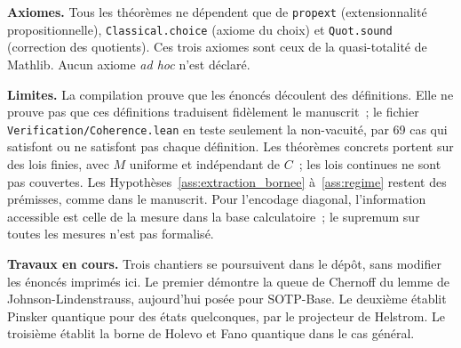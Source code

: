 \begin{sloppypar}
\noindent\textbf{Axiomes.} Tous les th\'eor\`emes ne d\'ependent que de \texttt{propext}
(extensionnalit\'e propositionnelle), \texttt{Classical.choice} (axiome du choix) et
\texttt{Quot.sound} (correction des quotients). Ces trois axiomes sont ceux de la quasi-totalit\'e
de Mathlib. Aucun axiome \emph{ad hoc} n'est d\'eclar\'e.

\medskip
\noindent\textbf{Limites.} La compilation prouve que les \'enonc\'es d\'ecoulent des
d\'efinitions. Elle ne prouve pas que ces d\'efinitions traduisent fid\`element le manuscrit~;
le fichier \texttt{Verification/Coherence.lean} en teste seulement la non-vacuit\'e, par
69 cas qui satisfont ou ne satisfont pas chaque d\'efinition. Les th\'eor\`emes concrets portent
sur des lois finies, avec $M$ uniforme et ind\'ependant de $C$~; les lois continues ne sont pas
couvertes. Les Hypoth\`eses~\ref{ass:extraction_bornee} \`a~\ref{ass:regime} restent des
pr\'emisses, comme dans le manuscrit. Pour l'encodage diagonal, l'information accessible est
celle de la mesure dans la base calculatoire~; le supremum sur toutes les mesures n'est pas
formalis\'e.

\medskip
\noindent\textbf{Travaux en cours.} Trois chantiers se poursuivent dans le d\'ep\^ot, sans
modifier les \'enonc\'es imprim\'es ici. Le premier d\'emontre la queue de Chernoff du lemme de
Johnson-Lindenstrauss, aujourd'hui pos\'ee pour SOTP-Base. Le deuxi\`eme \'etablit Pinsker
quantique pour des \'etats quelconques, par le projecteur de Helstrom. Le troisi\`eme \'etablit
la borne de Holevo et Fano quantique dans le cas g\'en\'eral.
\end{sloppypar}
